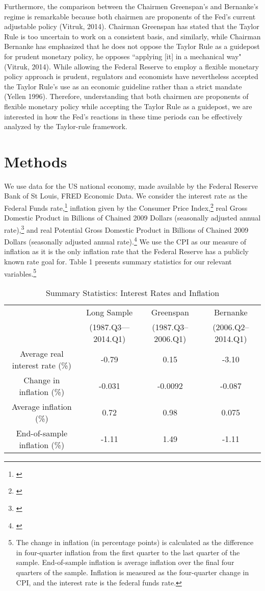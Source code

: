 \documentclass[notitlepage,12pt]{article}
\begin{document}
Furthermore, the comparison between the Chairmen Greenspan's and Bernanke's regime is remarkable because both chairmen are proponents of the Fed’s current adjustable policy (Vitruk, 2014). Chairman Greenspan has stated that the Taylor Rule is too uncertain to work on a consistent basis, and similarly, while Chairman Bernanke has emphasized that he does not oppose the Taylor Rule as a guidepost for prudent monetary policy, he opposes ``applying [it] in a mechanical way" (Vitruk, 2014). While allowing the Federal Reserve to employ a flexible monetary policy approach is prudent, regulators and economists have nevertheless accepted the Taylor Rule's use as an economic guideline rather than a strict mandate (Yellen 1996).\nocite{yellen1996monetary} Therefore, understanding that both chairmen are proponents of flexible monetary policy while accepting the Taylor Rule as a guidepost, we are interested in how the Fed's reactions in these time periods can be effectively analyzed by the Taylor-rule framework.


\section{Methods}
We use data for the US national economy, made available by the Federal Reserve Bank of St Louis, FRED Economic Data.  We consider the interest rate as the Federal Funds rate,\footnote{\cite{FEDFUNDS}} inflation given by the Consumer Price Index,\footnote{\cite{CPIU}} real Gross Domestic Product in Billions of Chained 2009 Dollars (seasonally adjusted annual rate),\footnote{\cite{GDPC1}} and real Potential Gross Domestic Product in Billions of Chained 2009 Dollars (seasonally adjusted annual rate).\footnote{\cite{GDPPOT}}  We use the CPI as our measure of inflation as it is the only inflation rate that the Federal Reserve has a publicly known rate goal for.  Table 1 presents summary statistics for our relevant variables.\footnote{The change in inflation (in percentage points) is calculated as the difference in four-quarter inflation from the first quarter to the last quarter
of the sample. End-of-sample inflation is average inflation over the final four quarters of the sample. Inflation is measured as the four-quarter change in CPI, and the interest rate is the federal funds rate.}

\begin{table}[H]
\caption{Summary Statistics: Interest Rates and Inflation}
\begin{tabular}{cccc}
                   & Long Sample & Greenspan & Bernanke     \\
                   & (1987.Q3---2014.Q1) & (1987.Q3--2006.Q1) & (2006.Q2--2014.Q1)    \\\midrule
Average real interest rate (\%)   & -0.79 & 0.15 & -3.10\\
Change in inflation  (\%)   &  -0.031  & -0.0092  & -0.087\\
Average inflation (\%) & 0.72 &0.98 &0.075\\
End-of-sample inflation (\%)  & -1.11 &1.49 &-1.11\\ \midrule \bottomrule
\end{tabular}
\end{table}
\end{document}
